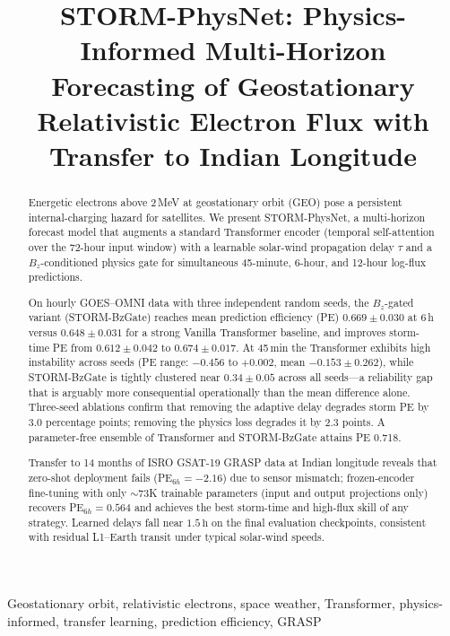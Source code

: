 \documentclass[conference]{IEEEtran}
\title{STORM-PhysNet: Physics-Informed Multi-Horizon Forecasting of
Geostationary Relativistic Electron Flux with Transfer to Indian Longitude}
\author{
\IEEEauthorblockN{Samarth BN}
\IEEEauthorblockA{BE in Electronics and Communication\\
RV College of Engineering, Bengaluru, India\\
Email: samarthbn.ec25@rvce.edu.in}
}
\begin{document}
\maketitle

\begin{abstract}
Energetic electrons above 2\,MeV at geostationary orbit (GEO) pose a
persistent internal-charging hazard for satellites. We present STORM-PhysNet,
a multi-horizon forecast model that augments a standard Transformer
encoder (temporal self-attention over the 72-hour input window) with
a learnable solar-wind propagation delay
\(\tau\) and a \(B_z\)-conditioned physics gate for simultaneous 45-minute,
6-hour, and 12-hour log-flux predictions.

On hourly GOES--OMNI data with three independent random seeds, the
\(B_z\)-gated variant (STORM-BzGate) reaches mean prediction efficiency
(PE) \(0.669\pm0.030\) at 6\,h versus \(0.648\pm0.031\) for a strong Vanilla
Transformer baseline, and improves storm-time PE from \(0.612\pm0.042\) to
\(0.674\pm0.017\). At 45\,min the Transformer exhibits high instability across
seeds (PE range: \(-0.456\) to \(+0.002\), mean \(-0.153\pm0.262\)), while STORM-BzGate
is tightly clustered near \(0.34\pm0.05\) across all seeds---a reliability
gap that is arguably more consequential operationally than the mean difference
alone. Three-seed ablations confirm
that removing the adaptive delay degrades storm PE by 3.0 percentage points;
removing the physics loss degrades it by 2.3 points. A parameter-free
ensemble of Transformer and STORM-BzGate attains PE 0.718.

Transfer to 14 months of ISRO GSAT-19 GRASP data at Indian longitude reveals
that zero-shot deployment fails (PE\(_{6h}=-2.16\)) due to sensor mismatch;
frozen-encoder fine-tuning with only \(\sim\)73K trainable parameters
(input and output projections only) recovers
PE\(_{6h}=0.564\) and achieves the best storm-time and high-flux skill of
any strategy. Learned delays fall near \(1.5\,\mathrm{h}\) on the final evaluation checkpoints, consistent with residual L1--Earth transit under typical solar-wind speeds.
\end{abstract}

\begin{IEEEkeywords}
Geostationary orbit, relativistic electrons, space weather, Transformer,
physics-informed, transfer learning, prediction efficiency, GRASP
\end{IEEEkeywords}
\end{document}
